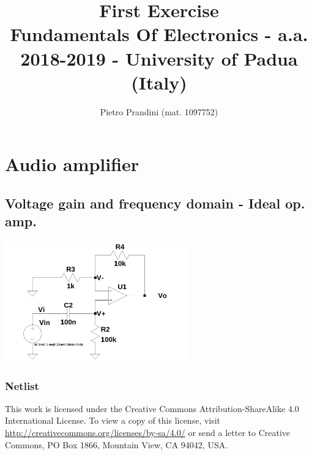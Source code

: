 \documentclass[10pt,a4paper]{article}
\title{First Exercise\\{\small{Fundamentals Of Electronics - a.a. 2018-2019 -
University of Padua (Italy)}}}
\author{Pietro Prandini (mat. 1097752)}
\begin{document}
\maketitle
\section{Audio amplifier}
\subsection{Voltage gain and frequency domain - Ideal op. amp.}
\includegraphics[width=8cm]{schematics/1d1.jpg}
\subsubsection{Netlist}


%

\vspace*{\fill}
\centering
\tiny{This work is licensed under the Creative Commons Attribution-ShareAlike
 4.0 International License. To view a copy of this license, visit
 \href{http://creativecommons.org/licenses/by-sa/4.0/}{http://creativecommons.org/licenses/by-sa/4.0/}
or send a letter to Creative Commons, PO Box 1866, Mountain View, CA 94042,
USA.}
\end{document}
